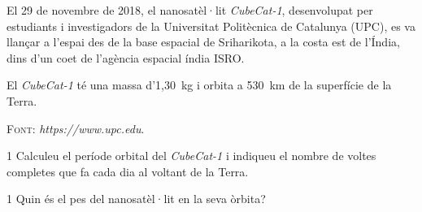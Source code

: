 El 29 de novembre de 2018, el nanosatèl·lit \textit{CubeCat-1}, desenvolupat per estudiants i investigadors de la Universitat Politècnica de Catalunya (UPC), es va llançar a l'espai des de la base espacial de Sriharikota, a la costa est de l'Índia, dins d'un coet de l'agència espacial índia ISRO.

El \textit{CubeCat-1} té una massa d'1,30~kg i orbita a 530~km de la superfície de la Terra.

{\centering \textsc{Font}: \textit{https://www.upc.edu}.\par}

\begin{apartat}{1}
Calculeu el període orbital del \textit{CubeCat-1} i indiqueu el nombre de voltes completes que fa cada dia al voltant de la Terra.
\end{apartat}

\begin{apartat}{1}
Quin és el pes del nanosatèl·lit en la seva òrbita?
\end{apartat}

